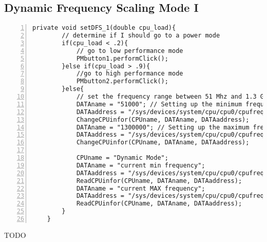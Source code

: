 \documentclass{article}	%
\begin{document}
\subsection{Dynamic Frequency Scaling Mode I}
\begin{lstlisting}[float=*,caption={Dynamic Frequency Scaling Mode I},label={lst:DFS_1},numbers=left]
private void setDFS_1(double cpu_load){
		// determine if I should go to a power mode
		if(cpu_load < .2){
			// go to low performance mode
			PMbutton1.performClick();
		}else if(cpu_load > .9){
			//go to high performance mode
			PMbutton2.performClick();
		}else{
			// set the frequency range between 51 Mhz and 1.3 Ghz
			DATAname = "51000"; // Setting up the minimum frequency 51 Mhz
			DATAaddress = "/sys/devices/system/cpu/cpu0/cpufreq/scaling_min_freq";
			ChangeCPUinfor(CPUname, DATAname, DATAaddress);
			DATAname = "1300000"; // Setting up the maximum frequency at 1300 MHz
			DATAaddress = "/sys/devices/system/cpu/cpu0/cpufreq/scaling_max_freq";
			ChangeCPUinfor(CPUname, DATAname, DATAaddress);

			CPUname = "Dynamic Mode";
			DATAname = "current min frequency";
			DATAaddress = "/sys/devices/system/cpu/cpu0/cpufreq/scaling_min_freq";
			ReadCPUinfor(CPUname, DATAname, DATAaddress);
			DATAname = "current MAX frequency";
			DATAaddress = "/sys/devices/system/cpu/cpu0/cpufreq/scaling_max_freq";
			ReadCPUinfor(CPUname, DATAname, DATAaddress);
		}
	}
\end{lstlisting}
TODO
\end{document}
